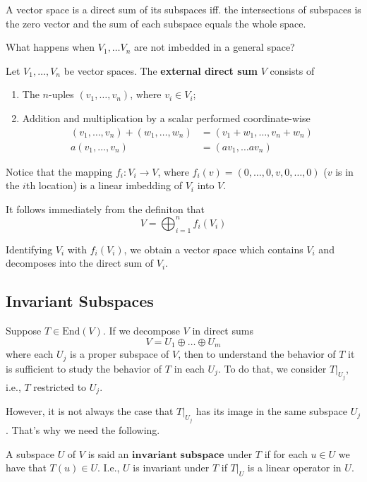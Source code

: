 A vector space is a direct sum of its subspaces iff. the intersections of subspaces is the zero vector and the sum of each subspace equals the whole space.

What happens when $V_1, \ldots V_n$ are not imbedded in a general space? 

\begin{definition}
	Let $V_1, \ldots, V_n$ be vector spaces. The \textbf{external direct sum} $V$ consists of 
	\begin{enumerate}
		\item The $n$-uples $(v_1, \ldots, v_n)$, where $v_i \in V_i$;
		\item Addition and multiplication by a scalar performed coordinate-wise 
		\begin{equation*}
			\begin{aligned}
				(v_1, \ldots, v_n) + (w_1, \ldots, w_n) &= (v_1 + w_1, \ldots, v_n + w_n) \\
				a (v_1, \ldots, v_n) &= (av_1, \ldots av_n)
			\end{aligned}
		\end{equation*}
	\end{enumerate}
\end{definition}

Notice that the mapping $f_i : V_i \longrightarrow V$, where $f_i(v) = (0, \ldots, 0, v, 0, \ldots, 0)$ ($v$ is in the $i$th location) is a linear imbedding of $V_i$ into $V$.

It follows immediately from the definiton that
\[
	V = \bigoplus_{i=1}^n f_i(V_i)
\]

Identifying $V_i$ with $f_i(V_i)$, we obtain a vector space which contains $V_i$ and decomposes into the direct sum of $V_i$.

\subsection{Invariant Subspaces}

Suppose $T \in \text{End}(V)$. If we decompose $V$ in direct sums
	\[
		V = U_1 \oplus \ldots \oplus U_m
	\]
where each $U_j$ is a proper subspace of $V$, then to understand the behavior of $T$ it is sufficient to study the behavior of $T$ in each $U_j$. To do that, we consider $T|_{U_j}$, i.e., $T$ restricted to $U_j$.

However, it is not always the case that $T|_{U_j}$ has its image in the same subspace ${U_j}$. That's why we need the following.

\begin{definition}
	A subspace $U$ of $V$ is said an $\textbf{invariant subspace}$ under $T$ if for each $u \in U$ we have that $T(u) \in U$. I.e., $U$ is invariant under $T$ if $T|_U$ is a linear operator in $U$.
\end{definition}